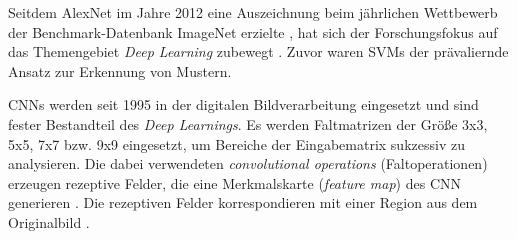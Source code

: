 Seitdem \gls{AlexNet} im Jahre 2012 eine Auszeichnung beim jährlichen Wettbewerb der Benchmark-Datenbank ImageNet erzielte \cite{imagenet}, hat sich der Forschungsfokus auf das Themengebiet \emph{Deep Learning} zubewegt \cites{NIPS2012_c399862d, rastegari2016xnornet, russakovsky2015imagenet}. Zuvor waren \acp{SVM} der prävaliernde Ansatz zur Erkennung von Mustern.

\acp{CNN} werden seit 1995 in der digitalen Bildverarbeitung eingesetzt und sind fester Bestandteil des \emph{Deep Learnings}. Es werden Faltmatrizen der Größe 3x3, 5x5, 7x7 bzw. 9x9 eingesetzt, um Bereiche der Eingabematrix sukzessiv zu analysieren. Die dabei verwendeten \emph{convolutional operations} (Faltoperationen) erzeugen rezeptive Felder, die eine Merkmalskarte (\emph{feature map}) des \ac{CNN} generieren \cite{russakovsky2015imagenet}. Die rezeptiven Felder korrespondieren mit einer Region aus dem Originalbild \cite{Yan2020}. 
\usetikzlibrary{matrix,positioning}
